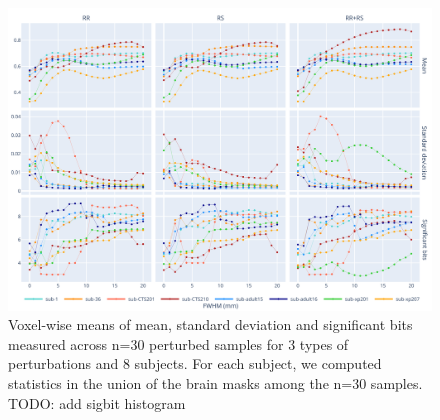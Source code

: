\documentclass{article}
\newcommand{\TODO}[1]{\color{red}\textsc{TODO:} #1\color{black}\xspace}
\begin{document}
\begin{figure}
    \centering
    \includegraphics[width=\linewidth]{figures/stats.pdf}
    \caption{Voxel-wise means of mean, standard deviation and significant bits
        measured across n=30 perturbed samples for 3 types of perturbations and 8
        subjects. For each subject, we computed statistics in the union of the brain
        masks among the n=30 samples. \TODO{add sigbit histogram }}
    \label{fig:numerical-uncertainty}
\end{figure}
\end{document}
